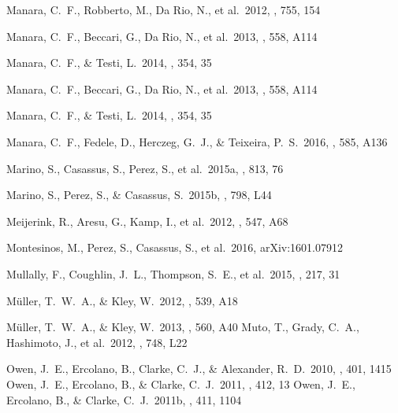 \begin{thebibliography}{2000b}
 Manara, C.~F., Robberto, 
M., Da Rio, N., et al.\ 2012, \apj, 755, 154 

 Manara, C.~F., Beccari, G., Da Rio, N., et al.\ 2013, \aap, 558, A114

 Manara, C.~F., \& Testi, L.\ 2014, \apss, 354, 35 

 Manara, C.~F., Beccari, G., Da Rio, N., et al.\ 2013, \aap, 558, A114

 Manara, C.~F., \& Testi, L.\ 2014, \apss, 354, 35

 Manara, C.~F., Fedele, D., Herczeg, G.~J., \& Teixeira, P.~S.\ 2016, \aap, 585, A136

 Marino, S., Casassus, S., Perez, S., et al.\ 2015a, \apj, 813, 76

 Marino, S., Perez, S., 
\& Casassus, S.\ 2015b, \apjl, 798, L44 

 Meijerink, R., Aresu, G., Kamp, I., et al.\ 2012, \aap, 547, A68 

 Montesinos, M., Perez, S., Casassus, S., et al.\ 2016, arXiv:1601.07912

 Mullally, F., 
Coughlin, J.~L., Thompson, S.~E., et al.\ 2015, \apjs, 217, 31 

 M{\"u}ller, T.~W.~A., \& Kley, W.\ 2012, \aap, 539, A18 

 M{\"u}ller, T.~W.~A., \& Kley, W.\ 2013, \aap, 560, A40 
 Muto, T., Grady, C.~A., 
Hashimoto, J., et al.\ 2012, \apjl, 748, L22 

 Owen, J.~E., Ercolano, B., 
Clarke, C.~J., \& Alexander, R.~D.\ 2010, \mnras, 401, 1415 
 Owen, J.~E., Ercolano, B., 
\& Clarke, C.~J.\ 2011, \mnras, 412, 13 
 Owen, J.~E., Ercolano, B., 
\& Clarke, C.~J.\ 2011b, \mnras, 411, 1104 


\end{thebibliography}
